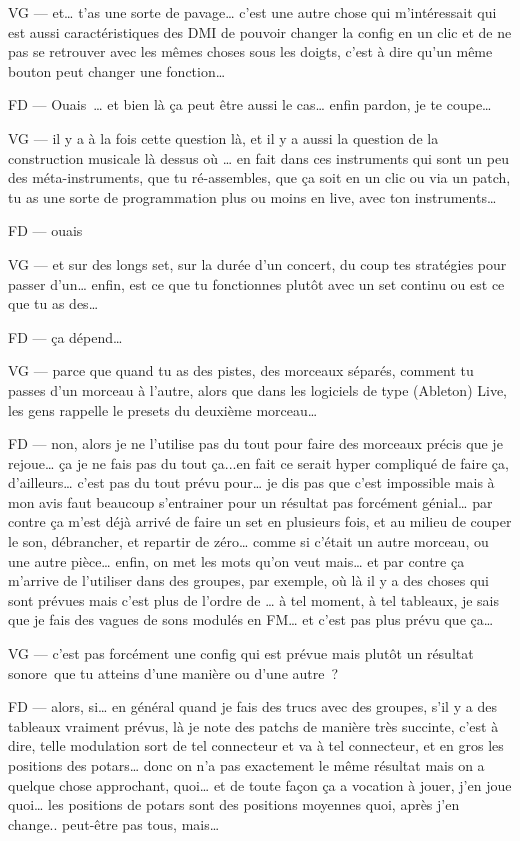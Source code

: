 VG —  et… t'as une sorte de pavage… c'est une autre chose qui m'intéressait qui est aussi caractéristiques des DMI de pouvoir changer la config en un clic et de ne pas se retrouver avec les mêmes choses sous les doigts, c'est à dire qu'un même bouton peut changer une fonction…  

FD —  Ouais … et bien là ça peut être aussi le cas… enfin pardon, je te coupe… 

VG —  il y a à la fois cette question là, et il y a aussi la question de la construction musicale là dessus où … en fait dans ces instruments qui sont un peu des méta-instruments, que tu ré-assembles, que ça soit en un clic ou via un patch, tu as une sorte de programmation plus ou moins en live, avec ton instruments…  

FD —  ouais 

VG —  et sur des longs set, sur la durée d'un concert, du coup tes stratégies pour passer d'un… enfin, est ce que tu fonctionnes plutôt avec un set continu ou est ce que tu as des… 

FD —  ça dépend… 

VG —  parce que quand tu as des pistes, des morceaux séparés, comment tu passes d'un morceau à l'autre, alors que dans les logiciels de type (Ableton) Live, les gens rappelle le presets du deuxième morceau… 

FD —  non, alors je ne l'utilise pas du tout pour faire des morceaux précis que je rejoue… ça je ne fais pas du tout ça...en fait ce serait hyper compliqué de faire ça, d'ailleurs… c'est pas du tout prévu pour… je dis pas que c'est impossible mais à mon avis faut beaucoup s'entrainer pour un résultat pas forcément génial… par contre ça m'est déjà arrivé de faire un set en plusieurs fois, et au milieu de couper le son, débrancher, et repartir de zéro… comme si c'était un autre morceau, ou une autre pièce… enfin, on met les mots qu'on veut mais… et par contre ça m'arrive de l'utiliser dans des groupes, par exemple, où là il y a des choses qui sont prévues mais c'est plus de l'ordre de … à tel moment, à tel tableaux, je sais que je fais des vagues de sons modulés en FM… et c'est pas plus prévu que ça… 

VG —  c'est pas forcément une config qui est prévue mais plutôt un résultat sonore que tu atteins d'une manière ou d'une autre ? 

FD —  alors, si… en général quand je fais des trucs avec des groupes, s'il y a des tableaux vraiment prévus, là je note des patchs de manière très succinte, c'est à dire, telle modulation sort de tel connecteur et va à tel connecteur, et en gros les positions des potars… donc on n'a pas exactement le même résultat mais on a quelque chose approchant, quoi… et de toute façon ça a vocation à jouer, j'en joue quoi… les positions de potars sont des positions moyennes quoi, après j'en change.. peut-être pas tous, mais… 

